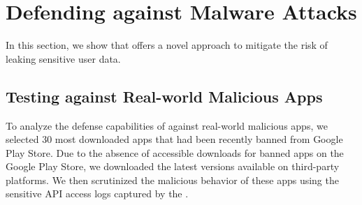 \newpage
\section{Defending against Malware Attacks}
\label{sec:mitigating_sca}


In this section, we show that \framework offers a novel approach to mitigate the
risk of leaking sensitive user data.

\subsection{Testing \framework{} against Real-world Malicious Apps}
\label{sec:malicious_apps}

To analyze the defense capabilities of \framework
against real-world malicious apps, we selected 30 most downloaded apps 
that had been recently banned from Google Play
Store. Due to the absence of accessible downloads for banned apps on the Google Play
Store, we downloaded the latest versions available on third-party platforms. 
We then scrutinized the malicious behavior of these apps using the sensitive API
access logs captured by the \framework.

